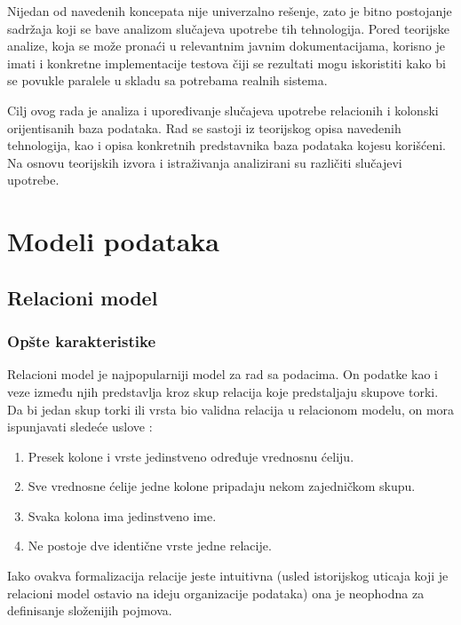\documentclass[12pt,oneside]{memoir}
\begin{document}
Nijedan od navedenih koncepata nije univerzalno rešenje, zato je bitno postojanje sadržaja koji se bave analizom slučajeva upotrebe tih tehnologija. Pored teorijske analize, koja se može pronaći u relevantnim javnim dokumentacijama, korisno je imati i konkretne implementacije testova čiji se rezultati mogu iskoristiti kako bi se povukle paralele u skladu sa potrebama realnih  sistema. 

Cilj ovog rada je analiza i upoređivanje slučajeva upotrebe relacionih i kolonski orijentisanih baza podataka. Rad se sastoji iz teorijskog opisa navedenih tehnologija, kao i opisa konkretnih predstavnika baza podataka kojesu korišćeni. Na osnovu teorijskih izvora i istraživanja analizirani su  različiti slučajevi upotrebe. 


\chapter{Modeli podataka}
\label{chp:razrada}
\section{Relacioni model}
\subsection{Opšte karakteristike}
Relacioni model je najpopularniji model za rad sa podacima. On podatke kao i veze između njih predstavlja kroz skup relacija koje predstaljaju skupove torki. Da bi jedan skup torki ili vrsta bio validna relacija u relacionom modelu, on mora ispunjavati sledeće uslove \cite{ColumnarOriented}:

\begin{enumerate}
\item[\textbullet] Presek kolone i vrste jedinstveno određuje vrednosnu ćeliju.

\item[\textbullet] Sve vrednosne ćelije jedne kolone pripadaju nekom zajedničkom skupu. 

\item[\textbullet] Svaka kolona ima jedinstveno ime.

\item[\textbullet] Ne postoje dve identične vrste jedne relacije. 
\end{enumerate}

Iako ovakva formalizacija relacije jeste intuitivna (usled istorijskog uticaja koji je relacioni model ostavio na ideju organizacije podataka) ona je neophodna za  definisanje složenijih pojmova. 
\end{document}
